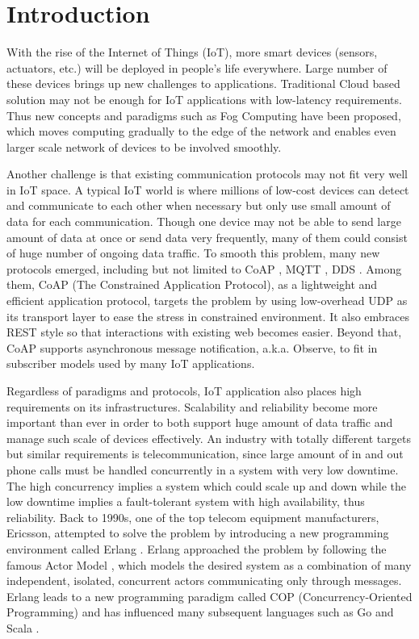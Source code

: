 \chapter{Introduction}\label{ch1}

With the rise of the Internet of Things (IoT), more smart devices (sensors, actuators, etc.) will be deployed in people's life everywhere. Large number of these devices brings up new challenges to applications. Traditional Cloud based solution may not be enough for IoT applications with low-latency requirements. Thus new concepts and paradigms such as Fog Computing \cite{Bonomi:2012:FCR:2342509.2342513} have been proposed, which moves computing gradually to the edge of the network and enables even larger scale network of devices to be involved smoothly. 

Another challenge is that existing communication protocols may not fit very well in IoT space. A typical IoT world is where millions of low-cost devices can detect and communicate to each other when necessary but only use small amount of data for each communication. Though one device may not be able to send large amount of data at once or send data very frequently, many of them could consist of huge number of ongoing data traffic. To smooth this problem, many new protocols emerged, including but not limited to CoAP \cite{coap_protocol}, MQTT \cite{mqtt_protocol}, DDS \cite{dds}. Among them, CoAP (The Constrained Application Protocol), as a lightweight and efficient application protocol, targets the problem by using low-overhead UDP as its transport layer to ease the stress in constrained environment. It also embraces REST style so that interactions with existing web becomes easier. Beyond that, CoAP supports asynchronous message notification, a.k.a. Observe, to fit in subscriber models used by many IoT applications. 
 
Regardless of paradigms and protocols, IoT application also places high requirements on its infrastructures. Scalability and reliability become more important than ever in order to both support huge amount of data traffic and manage such scale of devices effectively. An industry with totally different targets but similar requirements is telecommunication, since large amount of in and out phone calls must be handled concurrently in a system with very low downtime. The high concurrency implies a system which could scale up and down while the low downtime implies a fault-tolerant system with high availability, thus reliability. Back to 1990s, one of the top telecom equipment manufacturers, Ericsson, attempted to solve the problem by introducing a new programming environment called Erlang \cite{erl}. Erlang approached the problem by following the famous Actor Model \cite{agha1986actors}, which models the desired system as a combination of many independent, isolated, concurrent actors communicating only through messages. Erlang leads to a new programming paradigm called COP (Concurrency-Oriented Programming) \cite{armstrong2003concurrency} and has influenced many subsequent languages such as Go \cite{go} and Scala \cite{scala}.

